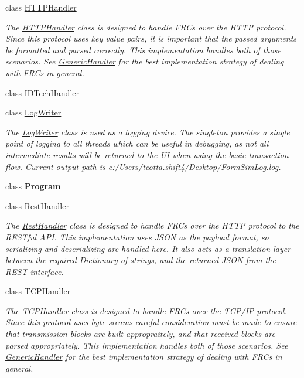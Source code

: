 \begin{DoxyCompactItemize}
class \mbox{\hyperlink{class_form_sim_1_1_h_t_t_p_handler}{H\+T\+T\+P\+Handler}}
\begin{DoxyCompactList}\small\item\em The \mbox{\hyperlink{class_form_sim_1_1_h_t_t_p_handler}{H\+T\+T\+P\+Handler}} class is designed to handle F\+R\+Cs over the H\+T\+TP protocol. Since this protocol uses key value pairs, it is important that the passed arguments be formatted and parsed correctly. This implementation handles both of those scenarios. See \mbox{\hyperlink{class_form_sim_1_1_generic_handler}{Generic\+Handler}} for the best implementation strategy of dealing with F\+R\+Cs in general. \end{DoxyCompactList}\item 
class \mbox{\hyperlink{class_form_sim_1_1_i_d_tech_handler}{I\+D\+Tech\+Handler}}
\item 
class \mbox{\hyperlink{class_form_sim_1_1_log_writer}{Log\+Writer}}
\begin{DoxyCompactList}\small\item\em The \mbox{\hyperlink{class_form_sim_1_1_log_writer}{Log\+Writer}} class is used as a logging device. The singleton provides a single point of logging to all threads which can be useful in debugging, as not all intermediate results will be returned to the UI when using the basic transaction flow. Current output path is c\+:/\+Users/tcotta.shift4/\+Desktop/\+Form\+Sim\+Log.\+log. \end{DoxyCompactList}\item 
class {\bfseries Program}
\item 
class \mbox{\hyperlink{class_form_sim_1_1_rest_handler}{Rest\+Handler}}
\begin{DoxyCompactList}\small\item\em The \mbox{\hyperlink{class_form_sim_1_1_rest_handler}{Rest\+Handler}} class is designed to handle F\+RC\textquotesingle{}s over the H\+T\+TP protocol to the R\+E\+S\+Tful A\+PI. This implementation uses J\+S\+ON as the payload format, so serializing and deserializing are handled here. It also acts as a translation layer between the required Dictionary of strings, and the returned J\+S\+ON from the R\+E\+ST interface. \end{DoxyCompactList}\item 
class \mbox{\hyperlink{class_form_sim_1_1_t_c_p_handler}{T\+C\+P\+Handler}}
\begin{DoxyCompactList}\small\item\em The \mbox{\hyperlink{class_form_sim_1_1_t_c_p_handler}{T\+C\+P\+Handler}} class is designed to handle F\+R\+Cs over the T\+C\+P/\+IP protocol. Since this protocol uses byte sreams careful consideration must be made to ensure that transmission blocks are built appropraitely, and that received blocks are parsed appropriately. This implementation handles both of those scenarios. See \mbox{\hyperlink{class_form_sim_1_1_generic_handler}{Generic\+Handler}} for the best implementation strategy of dealing with F\+R\+Cs in general. \end{DoxyCompactList}\end{DoxyCompactItemize}
